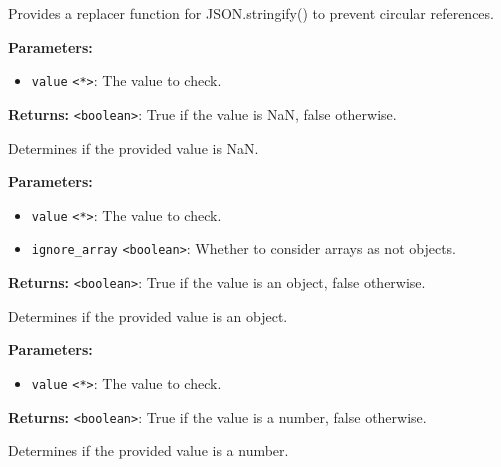 \documentclass[12pt,a4paper]{article}
\begin{document}
\noindent Provides a replacer function for JSON.stringify() to prevent circular references.

\vspace{5mm}
\noindent {}


\noindent \textbf{Parameters:}
\begin{itemize}
  \item \texttt{value} \texttt{<*>}: The value to check.
\end{itemize}

\noindent \textbf{Returns:} \texttt{<boolean>}: True if the value is NaN, false otherwise.

\noindent Determines if the provided value is NaN.

\vspace{5mm}
\noindent {}


\noindent \textbf{Parameters:}
\begin{itemize}
  \item \texttt{value} \texttt{<*>}: The value to check.
  \item \texttt{ignore\_array} \texttt{<boolean>}: Whether to consider arrays as not objects.
\end{itemize}

\noindent \textbf{Returns:} \texttt{<boolean>}: True if the value is an object, false otherwise.

\noindent Determines if the provided value is an object.

\vspace{5mm}
\noindent {}


\noindent \textbf{Parameters:}
\begin{itemize}
  \item \texttt{value} \texttt{<*>}: The value to check.
\end{itemize}

\noindent \textbf{Returns:} \texttt{<boolean>}: True if the value is a number, false otherwise.

\noindent Determines if the provided value is a number.
\end{document}
